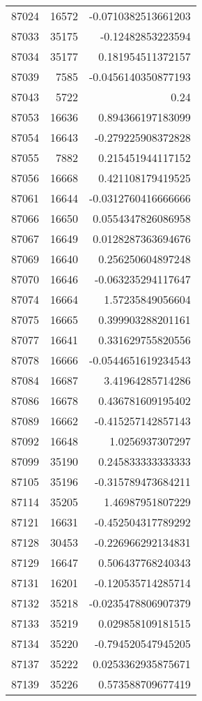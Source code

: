 \begin{tabular}{r | r | r}
87024 & 16572 & -0.0710382513661203 \\
87033 & 35175 & -0.12482853223594 \\
87034 & 35177 & 0.181954511372157 \\
87039 & 7585 & -0.0456140350877193 \\
87043 & 5722 & 0.24 \\
87053 & 16636 & 0.894366197183099 \\
87054 & 16643 & -0.279225908372828 \\
87055 & 7882 & 0.215451944117152 \\
87056 & 16668 & 0.421108179419525 \\
87061 & 16644 & -0.0312760416666666 \\
87066 & 16650 & 0.0554347826086958 \\
87067 & 16649 & 0.0128287363694676 \\
87069 & 16640 & 0.256250604897248 \\
87070 & 16646 & -0.063235294117647 \\
87074 & 16664 & 1.57235849056604 \\
87075 & 16665 & 0.399903288201161 \\
87077 & 16641 & 0.331629755820556 \\
87078 & 16666 & -0.0544651619234543 \\
87084 & 16687 & 3.41964285714286 \\
87086 & 16678 & 0.436781609195402 \\
87089 & 16662 & -0.415257142857143 \\
87092 & 16648 & 1.0256937307297 \\
87099 & 35190 & 0.245833333333333 \\
87105 & 35196 & -0.315789473684211 \\
87114 & 35205 & 1.46987951807229 \\
87121 & 16631 & -0.452504317789292 \\
87128 & 30453 & -0.226966292134831 \\
87129 & 16647 & 0.506437768240343 \\
87131 & 16201 & -0.120535714285714 \\
87132 & 35218 & -0.0235478806907379 \\
87133 & 35219 & 0.029858109181515 \\
87134 & 35220 & -0.794520547945205 \\
87137 & 35222 & 0.0253362935875671 \\
87139 & 35226 & 0.573588709677419 \\

\end{tabular}
